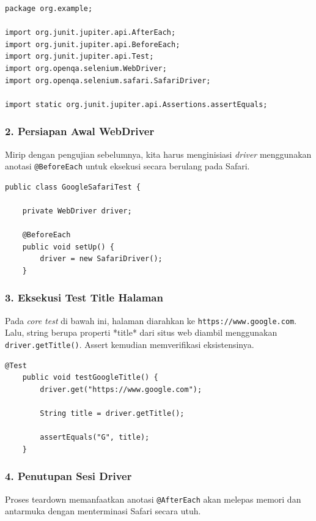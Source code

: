 \documentclass[a4paper,oneside,12pt]{report}
\begin{document}
\begin{lstlisting}[style=javastyle, caption=Import Code Navigasi Google]
package org.example;

import org.junit.jupiter.api.AfterEach;
import org.junit.jupiter.api.BeforeEach;
import org.junit.jupiter.api.Test;
import org.openqa.selenium.WebDriver;
import org.openqa.selenium.safari.SafariDriver;

import static org.junit.jupiter.api.Assertions.assertEquals;
\end{lstlisting}

\subsubsection*{2. Persiapan Awal WebDriver}
Mirip dengan pengujian sebelumnya, kita harus menginisiasi \textit{driver} menggunakan anotasi \texttt{@BeforeEach} untuk eksekusi secara berulang pada Safari.

\begin{lstlisting}[style=javastyle, caption=Inisialisasi Setup]
public class GoogleSafariTest {

    private WebDriver driver;

    @BeforeEach
    public void setUp() {
        driver = new SafariDriver();
    }
\end{lstlisting}

\subsubsection*{3. Eksekusi Test Title Halaman}
Pada \textit{core test} di bawah ini, halaman diarahkan ke \texttt{https://www.google.com}. Lalu, string berupa properti *title* dari situs web diambil menggunakan \texttt{driver.getTitle()}. Assert kemudian memverifikasi eksistensinya.

\begin{lstlisting}[style=javastyle, caption=Test Method Google Title]
    @Test
    public void testGoogleTitle() {
        driver.get("https://www.google.com");

        String title = driver.getTitle();

        assertEquals("G", title);
    }
\end{lstlisting}

\subsubsection*{4. Penutupan Sesi Driver}
Proses teardown memanfaatkan anotasi \texttt{@AfterEach} akan melepas memori dan antarmuka dengan menterminasi Safari secara utuh.
\end{document}
